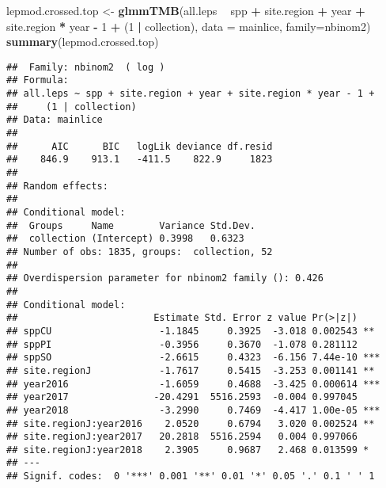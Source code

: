 \documentclass[]{article}
\newenvironment{Shaded}{\begin{snugshade}}{\end{snugshade}}
\newcommand{\KeywordTok}[1]{\textcolor[rgb]{0.13,0.29,0.53}{\textbf{#1}}}
\newcommand{\DataTypeTok}[1]{\textcolor[rgb]{0.13,0.29,0.53}{#1}}
\newcommand{\DecValTok}[1]{\textcolor[rgb]{0.00,0.00,0.81}{#1}}
\newcommand{\StringTok}[1]{\textcolor[rgb]{0.31,0.60,0.02}{#1}}
\newcommand{\OperatorTok}[1]{\textcolor[rgb]{0.81,0.36,0.00}{\textbf{#1}}}
\newcommand{\NormalTok}[1]{#1}
\begin{document}
\begin{Shaded}
\begin{Highlighting}[]
\NormalTok{lepmod.crossed.top <-}\StringTok{ }\KeywordTok{glmmTMB}\NormalTok{(all.leps }\OperatorTok{~}\StringTok{ }\NormalTok{spp }\OperatorTok{+}\StringTok{ }\NormalTok{site.region }\OperatorTok{+}\StringTok{ }\NormalTok{year }\OperatorTok{+}\StringTok{ }\NormalTok{site.region }\OperatorTok{*}\StringTok{ }\NormalTok{year }\OperatorTok{-}\StringTok{ }\DecValTok{1} \OperatorTok{+}\StringTok{ }\NormalTok{(}\DecValTok{1} \OperatorTok{|}\StringTok{ }\NormalTok{collection), }
                      \DataTypeTok{data =}\NormalTok{ mainlice, }\DataTypeTok{family=}\NormalTok{nbinom2)}
\KeywordTok{summary}\NormalTok{(lepmod.crossed.top)}
\end{Highlighting}
\end{Shaded}

\begin{verbatim}
##  Family: nbinom2  ( log )
## Formula:          
## all.leps ~ spp + site.region + year + site.region * year - 1 +  
##     (1 | collection)
## Data: mainlice
## 
##      AIC      BIC   logLik deviance df.resid 
##    846.9    913.1   -411.5    822.9     1823 
## 
## Random effects:
## 
## Conditional model:
##  Groups     Name        Variance Std.Dev.
##  collection (Intercept) 0.3998   0.6323  
## Number of obs: 1835, groups:  collection, 52
## 
## Overdispersion parameter for nbinom2 family (): 0.426 
## 
## Conditional model:
##                        Estimate Std. Error z value Pr(>|z|)    
## sppCU                   -1.1845     0.3925  -3.018 0.002543 ** 
## sppPI                   -0.3956     0.3670  -1.078 0.281112    
## sppSO                   -2.6615     0.4323  -6.156 7.44e-10 ***
## site.regionJ            -1.7617     0.5415  -3.253 0.001141 ** 
## year2016                -1.6059     0.4688  -3.425 0.000614 ***
## year2017               -20.4291  5516.2593  -0.004 0.997045    
## year2018                -3.2990     0.7469  -4.417 1.00e-05 ***
## site.regionJ:year2016    2.0520     0.6794   3.020 0.002524 ** 
## site.regionJ:year2017   20.2818  5516.2594   0.004 0.997066    
## site.regionJ:year2018    2.3905     0.9687   2.468 0.013599 *  
## ---
## Signif. codes:  0 '***' 0.001 '**' 0.01 '*' 0.05 '.' 0.1 ' ' 1
\end{verbatim}
\end{document}
